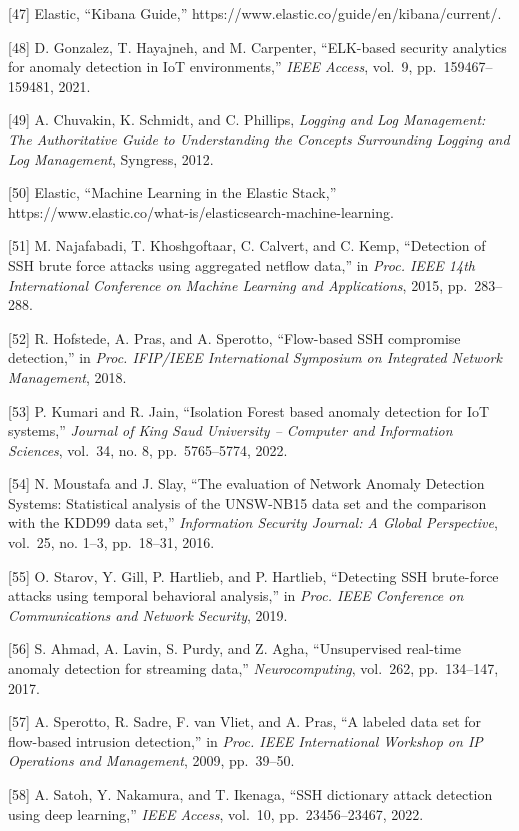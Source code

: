 \documentclass[
  a4paper]{report}
\begin{document}
{[}47{]} Elastic, ``Kibana Guide,''
https://www.elastic.co/guide/en/kibana/current/.

{[}48{]} D. Gonzalez, T. Hayajneh, and M. Carpenter, ``ELK-based
security analytics for anomaly detection in IoT environments,''
\emph{IEEE Access}, vol.~9, pp.~159467--159481, 2021.

{[}49{]} A. Chuvakin, K. Schmidt, and C. Phillips, \emph{Logging and Log
Management: The Authoritative Guide to Understanding the Concepts
Surrounding Logging and Log Management}, Syngress, 2012.

{[}50{]} Elastic, ``Machine Learning in the Elastic Stack,''
https://www.elastic.co/what-is/elasticsearch-machine-learning.

{[}51{]} M. Najafabadi, T. Khoshgoftaar, C. Calvert, and C. Kemp,
``Detection of SSH brute force attacks using aggregated netflow data,''
in \emph{Proc. IEEE 14th International Conference on Machine Learning
and Applications}, 2015, pp.~283--288.

{[}52{]} R. Hofstede, A. Pras, and A. Sperotto, ``Flow-based SSH
compromise detection,'' in \emph{Proc. IFIP/IEEE International Symposium
on Integrated Network Management}, 2018.

{[}53{]} P. Kumari and R. Jain, ``Isolation Forest based anomaly
detection for IoT systems,'' \emph{Journal of King Saud University --
Computer and Information Sciences}, vol.~34, no. 8, pp.~5765--5774,
2022.

{[}54{]} N. Moustafa and J. Slay, ``The evaluation of Network Anomaly
Detection Systems: Statistical analysis of the UNSW-NB15 data set and
the comparison with the KDD99 data set,'' \emph{Information Security
Journal: A Global Perspective}, vol.~25, no. 1--3, pp.~18--31, 2016.

{[}55{]} O. Starov, Y. Gill, P. Hartlieb, and P. Hartlieb, ``Detecting
SSH brute-force attacks using temporal behavioral analysis,'' in
\emph{Proc. IEEE Conference on Communications and Network Security},
2019.

{[}56{]} S. Ahmad, A. Lavin, S. Purdy, and Z. Agha, ``Unsupervised
real-time anomaly detection for streaming data,'' \emph{Neurocomputing},
vol.~262, pp.~134--147, 2017.

{[}57{]} A. Sperotto, R. Sadre, F. van Vliet, and A. Pras, ``A labeled
data set for flow-based intrusion detection,'' in \emph{Proc. IEEE
International Workshop on IP Operations and Management}, 2009,
pp.~39--50.

{[}58{]} A. Satoh, Y. Nakamura, and T. Ikenaga, ``SSH dictionary attack
detection using deep learning,'' \emph{IEEE Access}, vol.~10,
pp.~23456--23467, 2022.
\end{document}
